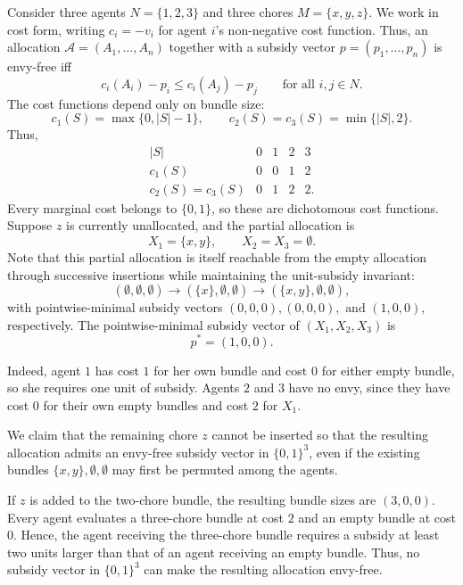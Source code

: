

\begin{example}
\label{app:extension-failure}

Consider three agents $N=\{1,2,3\}$ and three chores $M=\{x,y,z\}$. We work in cost form, writing \(c_i=-v_i\) for agent \(i\)'s non-negative cost function. Thus, an allocation \(\mathcal A=(A_1,\ldots,A_n)\) together with a subsidy vector \(p=(p_1,\ldots,p_n)\) is envy-free iff
\[
c_i(A_i)-p_i\le c_i(A_j)-p_j
\qquad\text{for all } i,j\in N.
\]
The cost functions depend only on bundle size: \[ c_1(S)=\max\{0,|S|-1\}, \qquad c_2(S)=c_3(S)=\min\{|S|,2\}. \] Thus, \[
\begin{array}{c|cccc}
|S| & 0 & 1 & 2 & 3\\
\hline
c_1(S) & 0 & 0 & 1 & 2\\
c_2(S)=c_3(S) & 0 & 1 & 2 & 2 .
\end{array}
\] Every marginal cost belongs to $\{0,1\}$, so these are dichotomous cost functions. Suppose  $z$ is currently unallocated, and the partial allocation is \[
X_1=\{x,y\},
\qquad
X_2=X_3=\emptyset.
\] Note that this partial allocation is itself reachable from the empty allocation through successive insertions while maintaining the unit-subsidy invariant:
\[
(\emptyset,\emptyset,\emptyset)
\longrightarrow
(\{x\},\emptyset,\emptyset)
\longrightarrow
(\{x,y\},\emptyset,\emptyset),
\]
with pointwise-minimal subsidy vectors
\(
(0,0,0), (0,0,0),\text{ and } (1,0,0),
\) respectively. The pointwise-minimal subsidy vector of $(X_1,X_2,X_3)$ is
\[
p^*=(1,0,0).
\]

Indeed, agent $1$ has cost $1$ for her own bundle and cost $0$ for either empty bundle, so she requires one unit of subsidy. Agents $2$ and $3$ have no envy, since they have cost $0$ for their own empty bundles and cost $2$ for $X_1$.

We claim that the remaining chore $z$ cannot be inserted so that the resulting allocation admits an envy-free subsidy vector in $\{0,1\}^3$, even if the existing bundles $\{x,y\},\emptyset,\emptyset$ may first be permuted among the agents.

If $z$ is added to the two-chore bundle, the resulting bundle sizes are $(3,0,0)$. Every agent evaluates a three-chore bundle at cost $2$ and an empty bundle at cost $0$. Hence, the agent receiving the three-chore bundle requires a subsidy at least two units larger than that of an agent receiving an empty bundle. Thus, no subsidy vector in $\{0,1\}^3$ can make the resulting allocation envy-free.


\end{example}
